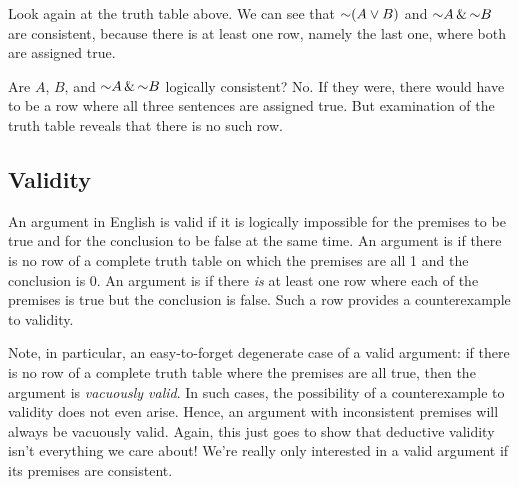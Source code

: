 Look again at the truth table above. We can see that $\enot(A \eor B)$ and $\enot A \eand \enot B$ are consistent, because there is at least one row, namely the last one, where both are assigned true.

Are $A$, $B$, and $\enot A \eand \enot B$ logically consistent? No. If they were, there would have to be a row where all three sentences are assigned true. But examination of the truth table reveals that there is no such row.

\subsection{Validity}
An argument in English is valid if it is logically impossible for the premises to be true and for the conclusion to be false at the same time.
An argument is  if there is no row of a complete truth table on which the premises are all 1 and the conclusion is 0. An argument is  if there \textit{is} at least one row where each of the premises is true but the conclusion is false. Such a row provides a counterexample to validity.

{\color{black} Note, in particular, an easy-to-forget degenerate case of a valid argument: if there is no row of a complete truth table where the premises are all true, then the argument is \textit{vacuously valid}. In such cases, the possibility of a counterexample to validity does not even arise. Hence, an argument with inconsistent premises will always be vacuously valid. Again, this just goes to show that deductive validity isn't everything we care about! We're really only interested in a valid argument if its premises are consistent.} 

